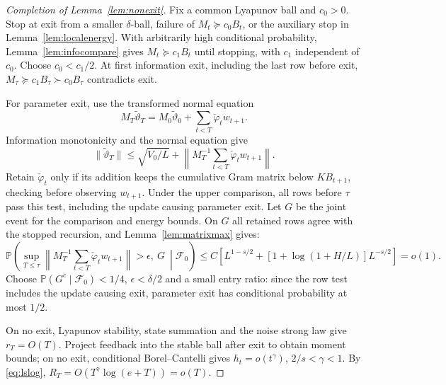 \documentclass[11pt,reqno]{amsart}
\numberwithin{equation}{section}
\theoremstyle{definition}
\theoremstyle{remark}
\newcommand{\Prob}{\mathbb P}
\newcommand{\F}{\mathcal F}
\newcommand{\phc}{\check{\varphi}}
\newcommand{\etac}{\widetilde{\vartheta}}
\begin{document}
\begin{proof}[Completion of Lemma~\ref{lem:nonexit}]
Fix a common Lyapunov ball and $c_0>0$. Stop at exit from a smaller $\delta$-ball, failure of $M_t\succeq c_0B_t$, or the auxiliary stop in Lemma~\ref{lem:localenergy}. With arbitrarily high conditional probability, Lemma~\ref{lem:infocompare} gives $M_t\succeq c_1B_t$ until stopping, with $c_1$ independent of $c_0$. Choose $c_0<c_1/2$. At first information exit, including the last row before exit, $M_\tau\succeq c_1B_\tau\succ c_0B_\tau$ contradicts exit.

For parameter exit, use the transformed normal equation
\begin{equation*}
 M_T\etac_T=M_0\etac_0+\sum_{t<T}\phc_tw_{t+1}.
\end{equation*}
Information monotonicity and the normal equation give
\[
 \|\etac_T\|\le\sqrt{V_0/L}+
 \left\|M_T^{-1}\sum_{t<T}\phc_tw_{t+1}\right\|.
\]
Retain $\phc_t$ only if its addition keeps the cumulative Gram matrix below $KB_{t+1}$, checking before observing $w_{t+1}$. Under the upper comparison, all rows before $\tau$ pass this test, including the update causing parameter exit. Let $G$ be the joint event for the comparison and energy bounds. On $G$ all retained rows agree with the stopped recursion, and Lemma~\ref{lem:matrixmax} gives:
\[
 \Prob\left(\sup_{T\le\tau}\left\|M_T^{-1}\sum_{t<T}\phc_tw_{t+1}\right\|>\epsilon,\ G\ \middle|\F_0\right)
 \le C\left[L^{1-s/2}+[1+\log(1+H/L)]L^{-s/2}\right]=o(1).
\]
Choose $\Prob(G^c\mid\F_0)<1/4$, $\epsilon<\delta/2$ and a small entry ratio: since the row test includes the update causing exit, parameter exit has conditional probability at most $1/2$.

On no exit, Lyapunov stability, state summation and the noise strong law give $r_T=O(T)$. Project feedback into the stable ball after exit to obtain moment bounds; on no exit, conditional Borel--Cantelli gives $h_t=o(t^\gamma)$, $2/s<\gamma<1$. By \eqref{eq:lslog}, $R_T=O(T^\gamma\log(e+T))=o(T)$.
\end{proof}
\end{document}
